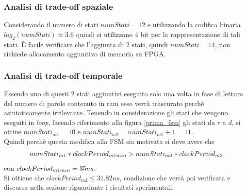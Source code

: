 \documentclass[11pt,a4paper]{article}
\begin{document}
            \subsubsection{Analisi di trade-off spaziale}
                Considerando il numero di stati $numStati = 12$ e utilizzando la codifica binaria $log_2(numStati) \approx 3.6$ quindi si utilizzano 4 bit per la rappresentazione di tali stati. È facile verificare che l'aggiunta di 2 stati, quindi $numStati = 14$, non richiede allocamento aggiuntivo di memoria su FPGA.
            \subsubsection{Analisi di trade-off temporale}
                Essendo uno di questi 2 stati aggiuntivi eseguito solo una volta in fase di lettura del numero di parole contenuto in ram esso verrà trascurato perchè asintoticamente irrilevante. Tenendo in considerazione gli stati che vengono eseguiti in \textit{loop}, facendo riferimento alla figura \ref{prima_fsm} gli stati da $r$ a $d$, si ottine $numStati_{m1} = 10$ e $numStati_{m2} =numStati_{m1} + 1= 11$.\\
                Quindi perchè questa modifica alla FSM sia motivata si deve avere che 
                \begin{gather*}
                    numStati_{m1} * clockPeriod_{m1 \space min} > numStati_{m2} * clockPeriod_{m2} 
                \end{gather*}
                con $clockPeriod_{m1 \space min} = 35 ns$.\\
                Si ottiene che $clockPeriod_{m2} \leq 31.82 ns$, condizione che verrà poi verificata e discussa nella sezione riguardante i risultati sperimentali.
\end{document}
